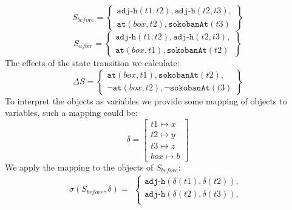 \documentclass[\master/Master.tex]{subfiles}
\begin{document}
\begin{example}
    \begin{equation*}\label{eq:s_before}
    S_{before} =
        \left\{
            \begin{gathered}
                \texttt{adj-h}(t1, t2), \texttt{adj-h}(t2, t3), \\
                \texttt{at}(box,t2), \texttt{sokobanAt}(t3)
            \end{gathered}
        \right\}
    \end{equation*}
    \begin{equation*}
    S_{after} =
        \left\{
            \begin{gathered}
                \texttt{adj-h}(t1, t2), \texttt{adj-h}(t2, t3), \\
                \texttt{at}(box,t1), \texttt{sokobanAt}(t2)
            \end{gathered}
        \right\}
    \end{equation*}
    The effects of the state transition we calculate:
    \begin{equation*}
    \Delta S =
        \left\{
            \begin{gathered}
                \texttt{at}(box, t1), \texttt{sokobanAt}(t2), \\
                \neg\texttt{at}(box,t2), \neg\texttt{sokobanAt}(t3)
            \end{gathered}
        \right\}
    \end{equation*}
    To interpret the objects as variables we provide some mapping of objects to variables, such a mapping could be:
    \begin{equation*}
    \delta =
        \left [
            \begin{gathered}
                t1 \mapsto x \\
                t2 \mapsto y \\
                t3 \mapsto z \\
                box \mapsto b
            \end{gathered}
        \right ]
    \end{equation*}
    We apply the mapping to the objects of $S_{before}$:
    \begin{equation*}
        \sigma(S_{before}, \delta) =
        \begin{gathered}
            \left\{
                \begin{gathered}
                    \texttt{adj-h}(\delta (t1), \delta (t2)), \\
                    \texttt{adj-h}(\delta (t2), \delta (t3)), \\

\end{gathered}
\end{gathered}
\end{equation*}
\end{example}
\end{document}
